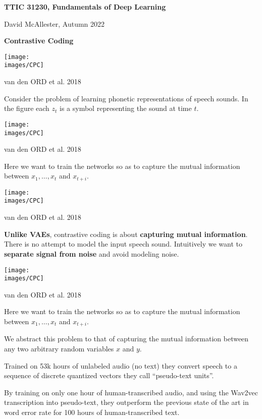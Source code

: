 





{\Huge
  \centerline{\bf TTIC 31230,  Fundamentals of Deep Learning}
  \vfill
  \centerline{David McAllester, Autumn   2022}
  \vfill
  \centerline{\bf Contrastive Coding}
  \vfill
  \vfill


\centerline{\texttt{[image: \\images/CPC]}}
\centerline{\huge van den ORD et al. 2018}

\vfill
Consider the problem of learning phonetic representations of speech sounds.  In the figure each $z_t$ is a symbol representing the sound at time $t$.


\centerline{\texttt{[image: \\images/CPC]}}
\centerline{\huge van den ORD et al. 2018}

\vfill
Here we want to train the networks so as to capture the mutual information between $x_1,\ldots,x_t$ and $x_{t+i}$.

\centerline{\texttt{[image: \\images/CPC]}}
\centerline{\huge van den ORD et al. 2018}

\vfill
{\bf Unlike VAEs}, contrastive coding is about {\bf capturing mutual information}. There is no attempt to model the input speech sound.
Intuitively we want to {\bf separate signal from noise} and avoid modeling noise.

\centerline{\texttt{[image: \\images/CPC]}}
\centerline{\huge van den ORD et al. 2018}

\vfill
Here we want to train the networks so as to capture the mutual information between $x_1,\ldots,x_t$ and $x_{t+i}$.

\vfill
We abstract this problem to that of capturing the mutual information between any two arbitrary random variables $x$ and $y$.


\vfill
Trained on 53k hours of unlabeled audio (no text) they convert speech to a sequence of discrete quantized vectors they call ``pseudo-text units''.

\vfill
By training on only one hour of human-transcribed audio, and using the Wav2vec transcription into pseudo-text, they outperform the previous state of the
art in word error rate for 100 hours of human-transcribed text.


}
